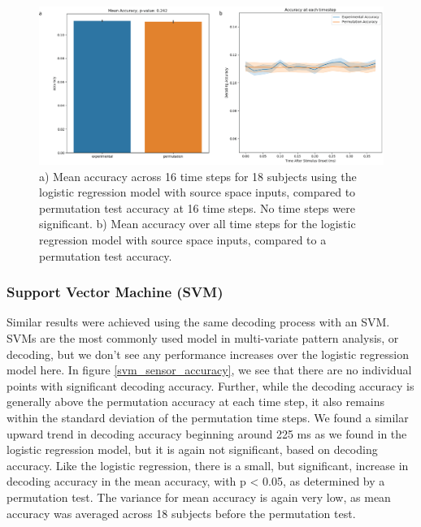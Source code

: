\documentclass[../main.tex]{subfiles}
\begin{document}
\begin{figure}
    \centering
    \includegraphics[scale=0.7]{figures/results/logistic_source_accuracy.png}
    \caption{a) Mean accuracy across 16 time steps for 18 subjects using the logistic regression model with source space inputs, compared to permutation test accuracy at 16 time steps. No time steps were significant. b) Mean accuracy over all time steps for the logistic regression model with source space inputs, compared to a permutation test accuracy.}
    \label{logistic_source_accuracy}
\end{figure}

\subsubsection{Support Vector Machine (SVM)}
Similar results were achieved using the same decoding process with an SVM. SVMs are the most commonly used model in multi-variate pattern analysis, or decoding, but we don't see any performance increases over the logistic regression model here. In figure \ref{svm_sensor_accuracy}, we see that there are no individual points with significant decoding accuracy. Further, while the decoding accuracy is generally above the permutation accuracy at each time step, it also remains within the standard deviation of the permutation time steps. We found a similar upward trend in decoding accuracy beginning around 225 ms as we found in the logistic regression model, but it is again not significant, based on decoding accuracy. Like the logistic regression, there is a small, but significant, increase in decoding accuracy in the mean accuracy, with p < 0.05, as determined by a permutation test. The variance for mean accuracy is again very low, as mean accuracy was averaged across 18 subjects before the permutation test.
\end{document}
